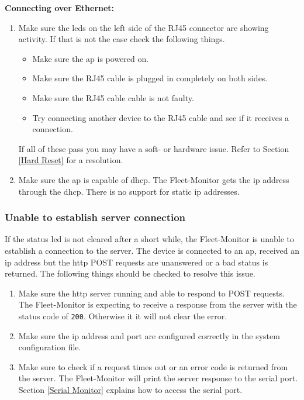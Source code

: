 \textbf{Connecting over Ethernet:}
\begin{enumerate}
  \item Make sure the \acrshort{led}s on the left side of the RJ45 connector are showing activity. If that is not the case check the following things.
  \begin{itemize}
      \item Make sure the \acrlong{ap} is powered on.
      \item Make sure the RJ45 cable is plugged in completely on both sides.
      \item Make sure the RJ45 cable cable is not faulty.
      \item Try connecting another device to the RJ45 cable and see if it receives a connection.
  \end{itemize}
  If all of these pass you may have a soft- or hardware issue. Refer to Section \ref{Hard Reset} for a resolution.
  \item Make sure the \acrlong{ap} is capable of \acrshort{dhcp}. The Fleet-Monitor gets the \acrshort{ip} address through the \acrlong{dhcp}. There is no support for static \acrshort{ip} addresses.
\end{enumerate}
\newpage

\subsubsection{Unable to establish server connection}\label{Unable to establish server connection}
If the status \acrshort{led} is not cleared after a short while, the Fleet-Monitor is unable to establish a connection to the server. The device is connected to an \acrshort{ap}, received an \acrshort{ip} address but the \acrshort{http} POST requests are unanswered or a bad status is returned. The following things should be checked to resolve this issue.

\begin{enumerate}
  \item Make sure the \acrshort{http} server running and able to respond to POST requests. The Fleet-Monitor is expecting to receive a response from the server with the status code of \texttt{200}. Otherwise it it will not clear the error.
  \item Make sure the \acrshort{ip} address and port are configured correctly in the system configuration file.
  \item Make sure to check if a request times out or an error code is returned from the server. The Fleet-Monitor will print the server response to the serial port. Section \ref{Serial Monitor} explains how to access the serial port.
\end{enumerate}

